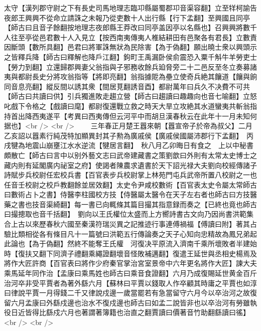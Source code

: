 太守【漢列郡守尉之下有長史司馬地理志臨卭縣屬蜀郡卭音渠容翻】立至䍧柯諭告夜郎王興興不從命立請誅之未報乃從吏數十人出行縣【行下孟翻】至興國且同亭【師古曰且音子餘翻按地理志夜郎縣王莽改曰同亭盖因亭以名縣也】召興興將數千人往至亭從邑君數十人入見立【按西南夷傳夷人椎結耕田有邑聚各有君長】立數責因斷頭【數所具翻】邑君曰將軍誅無狀為民除害【為于偽翻】願出曉士衆以興頭示之皆釋兵降【師古曰釋解也降戶江翻】鉤町王禹漏卧侯俞震恐入粟千斛牛羊勞吏士【勞力到翻】立還歸郡興妻父翁指與子邪務收餘兵廹脅旁二十二邑反至冬立奏募諸夷與都尉長史分將攻翁指等【將即亮翻】翁指據阸為壘立使奇兵絶其饟道【饟與餉同音息亮翻】縱反間以誘其衆【間居莧翻誘音酉】都尉萬年曰兵久不决費不可共【師古曰共讀曰供】引兵獨進敗走趨立營【師古曰趨讀曰趣趣向也音七喻翻】立怒叱戲下令格之【戲讀曰麾】都尉復還戰立救之時天大旱立攻絶其水道蠻夷共斬翁指持首出降西夷遂平【考異曰西夷傳但云河平中而胡旦漢春秋云在此年十一月未知何据也】<br />
<br />
　　三年春正月楚王囂來朝【囂宣帝子於帝為叔父】二月乙亥詔以囂素行純茂特加顯異封其子勲為廣戚侯【廣戚侯國屬沛郡行下孟翻】　丙戌犍為地震山崩壅江水水逆流【犍居言翻】　秋八月乙卯晦日有食之　上以中秘書頗散亡【師古曰言中以别外藝文志曰武帝建藏書之策劉歆曰外則有太常太史博士之藏内則有延閣廣内祕室之府】使謁者陳農求遺書於天下詔光禄大夫劉向校經傳諸子詩賦步兵校尉任宏校兵書【百官表步兵校尉掌上林苑門屯兵武帝所置八校尉之一也任音壬校尉之校戶教翻餘並居效翻】太史令尹咸校數術【百官表太史令屬太常師古曰數術占卜之書】侍醫李柱國校方技【侍醫屬太醫令在天子左右者也師古曰方技醫藥之書也技音渠綺翻】每一書已向輒條其篇目撮其指意録而奏之【已終也竟也師古曰撮摠取也音千括翻】　劉向以王氏權位太盛而上方嚮詩書古文向乃因尚書洪範集合上古以來歷春秋六國至秦漢符瑞災異之記推迹行事連傅禍福【傅讀曰附】著其占驗比類相從各有條目凡十一篇號曰洪範五行傳論奏之天子心知向忠精故為鳳兄弟起此論也【為于偽翻】然終不能奪王氏權　河復决平原流入濟南千乘所壞敗者半建始時【復扶又翻下同濟子禮翻乘繩證翻壞音怪敗補邁翻】復遣王延世與丞相史楊焉及將作大匠許商【百官表曰將作少府秦官掌治宮室景帝中六年更名將作大匠】諫大夫乘馬延年同作治【孟康曰乘馬姓也師古曰乘音食證翻】六月乃成復賜延世黄金百斤治河卒非受平賈者為著外繇六月【蘇林曰平賈以錢取人作卒顧其時庸之平賈也如淳曰律說平賈一月得錢二千又律說戍邊一歲當罷若有急當留守六月今以卒治河之故復留六月孟康曰外繇戍邊也治水不復戍邊也師古曰如孟二說皆非也以卒治河有勞雖執役日近皆得比繇戍六月也著謂著簿籍也治直之翻賈讀曰價著音竹助翻繇讀曰徭】<br />
<br />
